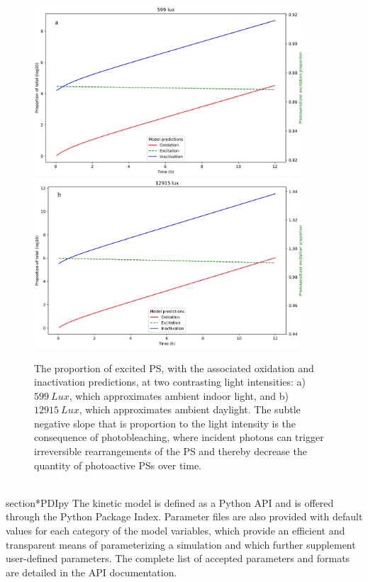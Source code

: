 \begin{figure}
    \centering
    \includegraphics[width = 0.9\textwidth]{images/PDIpy/sensitivity_analyses/light_intensity/599_lux.png} \\
    \vspace{5mm}
    \midrule
    \vspace{5mm}
    \includegraphics[width = 0.9\textwidth]{images/PDIpy/sensitivity_analyses/light_intensity/12915_lux.png}
    \caption{
        The proportion of excited PS, with the associated oxidation and inactivation predictions, at two contrasting light intensities: a) $599~Lux$, which approximates ambient indoor light, and b) $12915~Lux$, which approximates ambient daylight. The subtle negative slope that is proportion to the light intensity is the consequence of photobleaching, where incident photons can trigger irreversible rearrangements of the PS and thereby decrease the quantity of photoactive PSs over time.
    }
    \label{light_intensities}
\end{figure}

\\section*{PDIpy}
The kinetic model is defined as a Python API and is offered through the Python Package Index. Parameter files are also provided with default values for each category of the model variables, which provide an efficient and transparent means of parameterizing a simulation and which further supplement user-defined parameters. The complete list of accepted parameters and formats are detailed in the API documentation.

